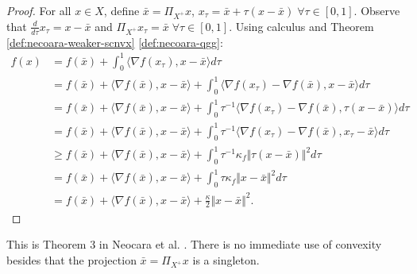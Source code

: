 \documentclass[12pt]{report}
\begin{document}
            \begin{proof}
                For all $x \in X$, define $\bar x = \Pi_{X^+}x$, $x_\tau = \bar x + \tau(x - \bar x)\; \forall \tau \in [0, 1]$. 
                Observe that $\frac{d}{d\tau}x_\tau = x - \bar x$ and $\Pi_{X^+}x_\tau = \bar x\; \forall \tau \in [0, 1]$. 
                Using calculus and Theorem \ref{def:necoara-weaker-scnvx} \ref{def:necoara-qgg}: 
                \begin{align*}
                    f(x) &= f(\bar x) + \int_0^1 \langle \nabla f(x_\tau), x - \bar x\rangle d\tau  
                    \\
                    &= f(\bar x) + \langle \nabla f(\bar x), x - \bar x\rangle + 
                    \int_0^1 \langle \nabla f(x_\tau) - \nabla f(\bar x), x - \bar x\rangle d \tau
                    \\
                    &= 
                    f(\bar x) + \langle \nabla f(\bar x), x - \bar x\rangle + 
                    \int_0^1 \tau^{-1}\langle \nabla f(x_\tau) - \nabla f(\bar x), \tau(x - \bar x)\rangle d \tau
                    \\
                    &= 
                    f(\bar x) + \langle \nabla f(\bar x), x - \bar x\rangle + 
                    \int_0^1 \tau^{-1}\langle \nabla f(x_\tau) - \nabla f(\bar x), x_\tau - \bar x\rangle d \tau
                    \\
                    &\ge
                    f(\bar x) + \langle \nabla f(\bar x), x - \bar x\rangle + 
                    \int_0^1 \tau^{-1}\kappa_f\Vert \tau(x - \bar x)\Vert^2 d \tau
                    \\
                    &= 
                    f(\bar x) + \langle \nabla f(\bar x), x - \bar x\rangle + 
                    \int_0^1 \tau\kappa_f\Vert x - \bar x \Vert^2 d \tau
                    \\
                    &= 
                    f(\bar x) + \langle \nabla f(\bar x), x - \bar x\rangle + 
                    \frac{\kappa}{2}\Vert x - \bar x\Vert^2. 
                \end{align*}
            \end{proof}
            \begin{remark}
                This is Theorem 3 in Neocara et al. \cite{necoara_linear_2019}. 
                There is no immediate use of convexity besides that the projection $\bar x = \Pi_{X^+}x$ is a singleton.
            \end{remark}
\end{document}
